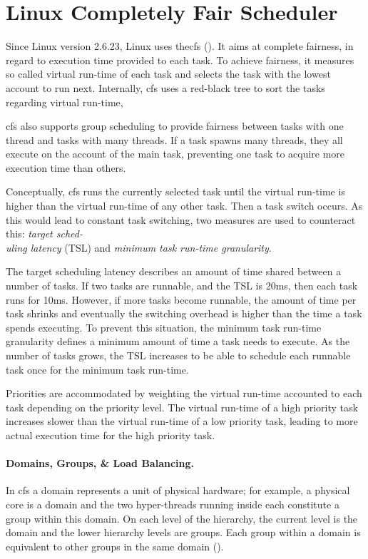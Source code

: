 \section{Linux Completely Fair Scheduler}
\label{state:cfs}


Since Linux version 2.6.23, Linux uses the\gls{cfs} (\cite{linux_cfs_doc}).
It aims at complete fairness, in regard to execution time provided to each task.
To achieve fairness, it measures so called virtual run-time of each task and
selects the task with the lowest account to run next.
Internally, \gls{cfs} uses a red-black tree to sort the tasks regarding virtual
run-time,

\gls{cfs} also supports group scheduling to provide fairness between tasks with one
thread and tasks with many threads.
If a task spawns many threads, they all execute on the account of the main
task, preventing one task to acquire more execution time than others.

Conceptually, \gls{cfs} runs the currently selected task until the virtual run-time is
higher than the virtual run-time of any other task.
Then a task switch occurs.
As this would lead to constant task switching, two measures are used to
counteract this:
\emph{target sched-\\ uling latency} (TSL) and \emph{minimum task run-time granularity}.

The target scheduling latency describes an amount of time shared between a
number of tasks.
If two tasks are runnable, and the TSL is 20ms, then each task runs for 10ms.
However, if more tasks become runnable, the amount of time per task shrinks and
eventually the switching overhead is higher than the time a task spends
executing.
To prevent this situation, the minimum task run-time granularity defines a
minimum amount of time a task needs to execute.
As the number of tasks grows, the TSL increases to be able to schedule each
runnable task once for the minimum task run-time.

Priorities are accommodated by weighting the virtual run-time accounted to each
task depending on the priority level.
The virtual run-time of a high priority task increases slower than the virtual
run-time of a low priority task, leading to more actual execution time for the
high priority task.

\paragraph{Domains, Groups, \& Load Balancing.}
In \gls{cfs} a domain represents a unit of physical hardware;
for example, a physical core is a domain and the two hyper-threads running
inside each constitute a group within this domain.
On each level of the hierarchy, the current level is the domain and the lower
hierarchy levels are groups.
Each group within a domain is equivalent to other groups in the same domain
(\cite{lwn_sched_domains}).


